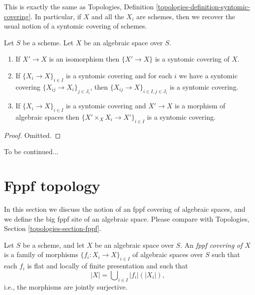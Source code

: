 \noindent
This is exactly the same as
Topologies, Definition \ref{topologies-definition-syntomic-covering}.
In particular, if $X$ and all the $X_i$ are schemes, then we recover the
usual notion of a syntomic covering of schemes.

\begin{lemma}
\label{lemma-syntomic}
Let $S$ be a scheme.
Let $X$ be an algebraic space over $S$.
\begin{enumerate}
\item If $X' \to X$ is an isomorphism then $\{X' \to X\}$
is a syntomic covering of $X$.
\item If $\{X_i \to X\}_{i\in I}$ is a syntomic covering and for each
$i$ we have a syntomic covering $\{X_{ij} \to X_i\}_{j\in J_i}$, then
$\{X_{ij} \to X\}_{i \in I, j\in J_i}$ is a syntomic covering.
\item If $\{X_i \to X\}_{i\in I}$ is a syntomic covering
and $X' \to X$ is a morphism of algebraic spaces then
$\{X' \times_X X_i \to X'\}_{i\in I}$ is a syntomic covering.
\end{enumerate}
\end{lemma}

\begin{proof}
Omitted.
\end{proof}

\noindent
To be continued...










\section{Fppf topology}
\label{section-fppf}

\noindent
In this section we discuss the notion of an fppf covering of algebraic spaces,
and we define the big fppf site of an algebraic space. Please compare with
Topologies, Section \ref{topologies-section-fppf}.

\begin{definition}
\label{definition-fppf-covering}
Let $S$ be a scheme, and let $X$ be an algebraic space over $S$.
An {\it fppf covering of $X$} is a family of morphisms
$\{f_i : X_i \to X\}_{i \in I}$ of algebraic spaces over $S$
such that each $f_i$ is flat and locally of finite presentation
and such that
$$
|X| = \bigcup\nolimits_{i \in I} |f_i|(|X_i|),
$$
i.e., the morphisms are jointly surjective.
\end{definition}


